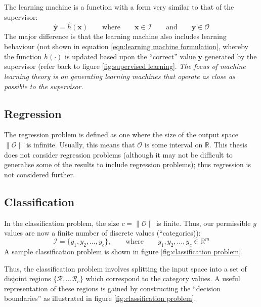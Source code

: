 The learning machine is a function with a form very similar to that of
the supervisor:
%
\begin{equation}
\mathbf{\hat{y}} = \hat{h}(\mathbf{x}) \qquad \mbox{where} \qquad
\mathbf{x} \in \mathcal{I} \qquad \mbox{and} \qquad \mathbf{y} \in
\mathcal{O}
\label{eqn:learning machine formulation}
\end{equation}
%
The major difference is that the learning machine also includes
learning behaviour (not shown in equation \ref{eqn:learning machine
formulation}, whereby the function $\hat{h}(\cdot)$ is updated
based upon the ``correct'' value $\mathbf{y}$ generated by the
supervisor (refer back to figure \ref{fig:supervised learning}.
\emph{The focus of machine learning theory is on generating learning
machines that operate as close as possible to the supervisor.}



\subsection{Regression}
\label{sec:regression}

The regression problem is defined as one where the size of the output
space $\|\mathcal{O}\|$ is infinite.  Usually, this means that
$\mathcal{O}$ is some interval on $\mathbb{R}$.  This thesis does not
consider regression problems (although it may not be difficult to
generalise some of the results to include regression problems); thus
regression is not considered further.




\subsection{Classification}
\label{sec:classification}

In the classification problem, the size $c = \| \mathcal{O} \|$ is
finite.  Thus, our permissible
$y$ values are now a finite number of discrete values (``categories)):
%
\begin{equation}
\mathcal{I} = \{y_1, y_2, \ldots, y_c\}, \qquad \mbox{where} \qquad y_1, y_2,
\ldots, y_c \in \mathbb{R}^m
\end{equation}
%
A sample classification problem is shown in
figure \ref{fig:classification problem}.

Thus, the classification problem involves splitting the input space
into a set of disjoint regions $\{ \mathcal{R}_1 \ldots \mathcal{R}_c
\}$ which correspond to the category values.  A useful representation
of these regions is gained by constructing the ``decision boundaries''
as illustrated in figure \ref{fig:classification problem}.


